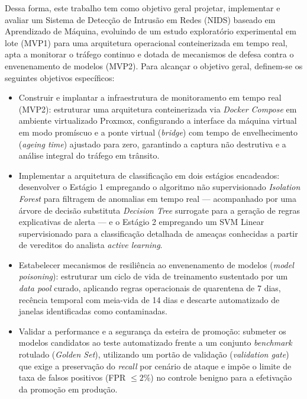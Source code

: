 \documentclass[a4paper,10pt, twocolumn]{article}
\begin{document}
Dessa forma, este trabalho tem como objetivo geral projetar, implementar e avaliar 
um Sistema de Detecção de Intrusão em Redes (NIDS) baseado em Aprendizado de Máquina, 
evoluindo de um estudo exploratório experimental em lote (MVP1) para uma arquitetura 
operacional conteinerizada em tempo real, apta a monitorar o tráfego continuo e 
dotada de mecanismos de defesa contra o envenenamento de modelos (MVP2). Para 
alcançar o objetivo geral, definem-se os seguintes objetivos específicos:

\begin{itemize}
    \item Construir e implantar a infraestrutura de monitoramento em tempo real (MVP2): estruturar uma arquitetura conteinerizada via \textit{Docker Compose} em ambiente virtualizado Proxmox, configurando a interface da máquina virtual em modo promíscuo e a ponte virtual (\textit{bridge}) com tempo de envelhecimento (\textit{ageing time}) ajustado para zero, garantindo a captura não destrutiva e a análise integral do tráfego em trânsito.
    \item Implementar a arquitetura de classificação em dois estágios encadeados: desenvolver o Estágio 1 empregando o algoritmo não supervisionado \textit{Isolation Forest} para filtragem de anomalias em tempo real — acompanhado por uma árvore de decisão substituta \textit{Decision Tree} surrogate para a geração de regras explicativas de alerta — e o Estágio 2 empregando um SVM Linear supervisionado para a classificação detalhada de ameaças conhecidas a partir de vereditos do analista \textit{active learning}.
    \item Estabelecer mecanismos de resiliência ao envenenamento de modelos (\textit{model poisoning}): estruturar um ciclo de vida de treinamento sustentado por um \textit{data pool} curado, aplicando regras operacionais de quarentena de 7 dias, recência temporal com meia-vida de 14 dias e descarte automatizado de janelas identificadas como contaminadas.
	\item Validar a performance e a segurança da esteira de promoção: submeter os modelos candidatos ao teste automatizado frente a um conjunto \textit{benchmark} rotulado (\textit{Golden Set}), utilizando um portão de validação (\textit{validation gate}) que exige a preservação do \textit{recall} por cenário de ataque e impõe o limite de taxa de falsos positivos (FPR $\leq 2\%$) no controle benigno para a efetivação da promoção em produção.
\end{itemize}
\end{document}
